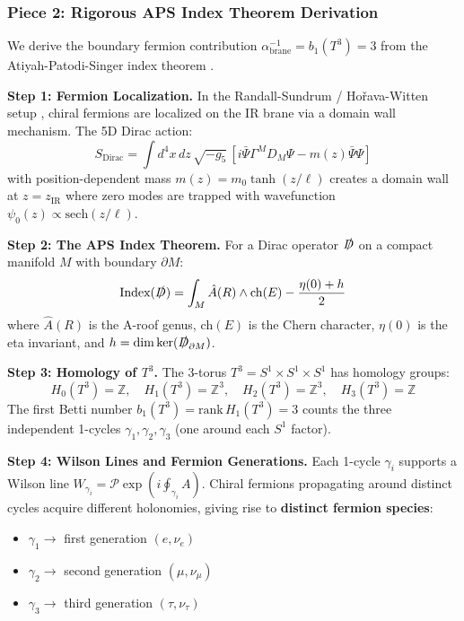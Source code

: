 \documentclass[12pt,a4paper]{article}
\begin{document}
\subsubsection{Piece 2: Rigorous APS Index Theorem Derivation}

We derive the boundary fermion contribution $\alpha_{\text{brane}}^{-1} = b_1(T^3) = 3$ from the Atiyah-Patodi-Singer index theorem \cite{APS}.

\textbf{Step 1: Fermion Localization.}
In the Randall-Sundrum / Ho\v{r}ava-Witten setup \cite{HoravaWitten}, chiral fermions are localized on the IR brane via a domain wall mechanism. The 5D Dirac action:
\begin{equation}
S_{\text{Dirac}} = \int d^4x\, dz\, \sqrt{-g_5}\, \left[i\bar{\Psi}\Gamma^M D_M \Psi - m(z)\bar{\Psi}\Psi\right]
\end{equation}
with position-dependent mass $m(z) = m_0 \tanh(z/\ell)$ creates a domain wall at $z = z_{\text{IR}}$ where zero modes are trapped with wavefunction $\psi_0(z) \propto \text{sech}(z/\ell)$.

\textbf{Step 2: The APS Index Theorem.}
For a Dirac operator $\slashed{D}$ on a compact manifold $M$ with boundary $\partial M$:
\begin{equation}
\text{Index}(\slashed{D}) = \int_M \hat{A}(R) \wedge \text{ch}(E) - \frac{\eta(0) + h}{2}
\end{equation}
where $\hat{A}(R)$ is the A-roof genus, $\text{ch}(E)$ is the Chern character, $\eta(0)$ is the eta invariant, and $h = \dim\ker(\slashed{D}_{\partial M})$.

\textbf{Step 3: Homology of $T^3$.}
The 3-torus $T^3 = S^1 \times S^1 \times S^1$ has homology groups:
\begin{equation}
H_0(T^3) = \mathbb{Z}, \quad H_1(T^3) = \mathbb{Z}^3, \quad H_2(T^3) = \mathbb{Z}^3, \quad H_3(T^3) = \mathbb{Z}
\end{equation}
The first Betti number $b_1(T^3) = \text{rank}\, H_1(T^3) = 3$ counts the three independent 1-cycles $\gamma_1, \gamma_2, \gamma_3$ (one around each $S^1$ factor).

\textbf{Step 4: Wilson Lines and Fermion Generations.}
Each 1-cycle $\gamma_i$ supports a Wilson line $W_{\gamma_i} = \mathcal{P}\exp(i\oint_{\gamma_i} A)$. Chiral fermions propagating around distinct cycles acquire different holonomies, giving rise to \textbf{distinct fermion species}:
\begin{itemize}
    \item $\gamma_1 \to$ first generation $(e, \nu_e)$
    \item $\gamma_2 \to$ second generation $(\mu, \nu_\mu)$
    \item $\gamma_3 \to$ third generation $(\tau, \nu_\tau)$
\end{itemize}
\end{document}
